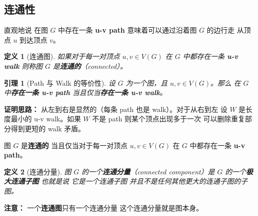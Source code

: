\documentclass[12pt, a4paper]{article}
\newtheorem{definition}{定义}[section]
\newtheorem{lemma}{引理}[section]
\begin{document}

\newpage
\subsection{连通性}

直观地说
在图 $G$ 中存在一条 \textbf{u-v path}
意味着可以通过沿着图 $G$ 的边行走
从顶点 $u$ 到达顶点 $v$。

\begin{definition}[连通图]
如果对于每一对顶点 $u, v \in V(G)$
在 $G$ 中都存在一条 \textbf{u-v walk}
则称图 $G$ 是\textbf{连通的}（connected）。
\end{definition}

\begin{lemma}[Path 与 Walk 的等价性]
设 $G$ 为一个图，且 $u, v \in V(G)$。那么
在 $G$ 中\textbf{存在一条 u-v path} 当且仅当\textbf{存在一条 u-v walk}。
\end{lemma}

\textbf{证明思路：} 从左到右是显然的（每条 path 也是 walk）。对于从右到左
设 $W$ 是长度最小的 u-v walk。如果 $W$ 不是 path
则某个顶点出现多于一次
可以删除重复部分得到更短的 walk
矛盾。

\begin{corollary}[连通性的等价定义]
图 $G$ 是\textbf{连通的}
当且仅当对于每一对顶点 $u, v \in V(G)$
在 $G$ 中都存在一条 \textbf{u-v path}。
\end{corollary}

\begin{definition}[连通分量]
图 $G$ 的一个\textbf{连通分量}（connected component）是 $G$ 的一个\textbf{极大连通子图}
也就是说
它是一个连通子图
并且不是任何其他更大的连通子图的子图。
\end{definition}

\textbf{注意：} 一个\textbf{连通图}只有一个连通分量
这个连通分量就是图本身。
\end{document}
